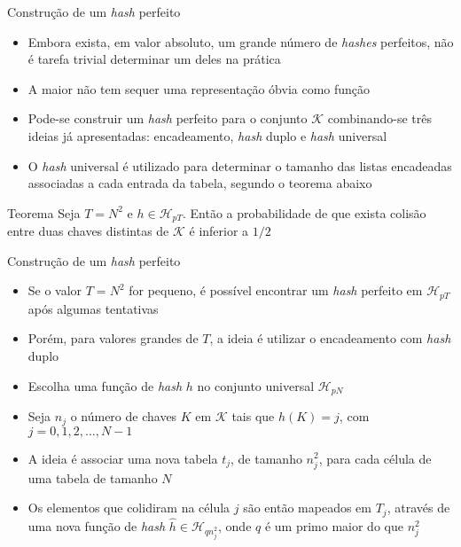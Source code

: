 \begin{frame}[fragile]{Construção de um {\it hash} perfeito}

    \begin{itemize}
        \item Embora exista, em valor absoluto, um grande número de \textit{hashes} perfeitos,
            não é tarefa trivial determinar um deles na prática

        \item A maior não tem sequer uma representação óbvia como função

        \item Pode-se construir um \textit{hash} perfeito para o conjunto $\mathcal{K}$
            combinando-se três ideias já apresentadas: encadeamento, \textit{hash} duplo e 
                \textit{hash} universal

        \item O \textit{hash} universal é utilizado para determinar o tamanho das listas
            encadeadas associadas a cada entrada da tabela, segundo o teorema abaixo
    \end{itemize}

    \begin{block}{Teorema}
        Seja $T = N^2$ e $h \in \mathcal{H}_{pT}$. Então a probabilidade de que exista
        colisão entre duas chaves distintas de $\mathcal{K}$ é inferior a $1/2$
    \end{block}
	
\end{frame}

\begin{frame}[fragile]{Construção de um {\it hash} perfeito}

    \begin{itemize}
        \item Se o valor $T = N^2$ for pequeno, é possível encontrar um \textit{hash} perfeito em
            $\mathcal{H}_{pT}$ após algumas tentativas

        \item Porém, para valores grandes de $T$, a ideia é utilizar o encadeamento com
            \textit{hash} duplo

        \item Escolha uma função de \textit{hash} $h$ no conjunto universal $\mathcal{H}_{pN}$
 
        \item Seja $n_j$ o número de chaves $K$ em $\mathcal{K}$ tais que $h(K) = j$, com
            $j = 0, 1, 2, \ldots, N - 1$

        \item A ideia é associar uma nova tabela $t_j$, de 
            tamanho $n_j^2$, para cada célula de uma tabela de tamanho $N$

        \item Os elementos que colidiram na célula $j$ são então mapeados em $T_j$, através de uma
            nova função de \textit{hash} $\hat{h}\in \mathcal{H}_{qn_j^2}$, onde $q$ é um
            primo maior do que $n_j^2$
    \end{itemize}

\end{frame}

